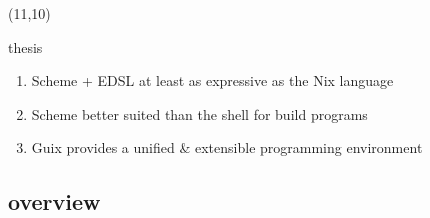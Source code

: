 \documentclass{beamer}
\begin{document}
\begin{frame}
\begin{textblock}{5}
{    }
  \end{textblock}
  
  \begin{textblock}{5}(11,10)
  \end{textblock}
\end{frame}

\begin{frame}{thesis}

  \Large{
    \begin{enumerate}
    \item Scheme + EDSL at least as \alert{expressive} as the Nix
      language
    \item<2-> Scheme better suited than the shell for \alert{build
        programs}
    \item<3-> Guix provides a \alert{unified \& extensible} programming
      environment
    \end{enumerate}
  }    
\end{frame}

\subsection{overview}
\end{document}
